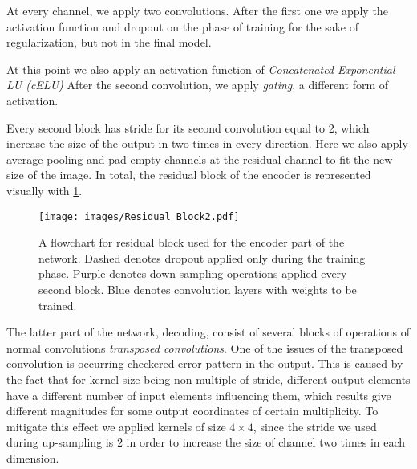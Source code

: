 At every channel, we apply two convolutions.
After the first one we apply the activation function and dropout on the phase of training for the sake of regularization, but not in the final model.
\medskip

At this point we also apply an activation function of \emph{Concatenated Exponential LU (cELU)}
After the second convolution, we apply \emph{gating}, a different form of activation.
\medskip

Every second block has stride for its second convolution equal to 2, which increase the size of the output in two times in every direction.
Here we also apply average pooling and pad empty channels at the residual channel to fit the new size of the image.
In total, the residual block of the encoder is represented visually with \ref{fig:res_block}.
\begin{figure}
	\centering
	\texttt{[image: images/Residual\_Block2.pdf]}
	\label{fig:res_block}
	\caption{A flowchart for residual block used for the encoder part of the network. Dashed denotes dropout applied only during the training phase. Purple denotes down-sampling operations applied every second block. Blue denotes convolution layers with weights to be trained.}
\end{figure}
\medskip

The latter part of the network, decoding, consist of several blocks of operations of normal convolutions \textit{transposed convolutions}.
One of the issues of the transposed convolution is occurring checkered error pattern in the output.
This is caused by the fact that for kernel size being non-multiple of stride, different output elements have a different number of input elements influencing them, which results give different magnitudes for some output coordinates of certain multiplicity.
To mitigate this effect we applied kernels of size $4 \times 4$, since the stride we used during up-sampling is $2$ in order to increase the size of channel two times in each dimension.
\medskip


